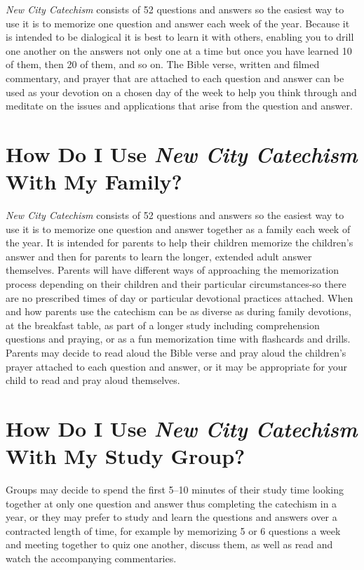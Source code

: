 \documentclass[titlepage]{memoir}
\begin{document}
\emph{New City Catechism}\/ consists of 52 questions and answers so the easiest way to use it is to memorize one question and answer each week of the year. Because it is intended to be dialogical it is best to learn it with others, enabling you to drill one another on the answers not only one at a time but once you have learned 10 of them, then 20 of them, and so on. The Bible verse, written and filmed commentary, and prayer that are attached to each question and answer can be used as your devotion on a chosen day of the week to help you think through and meditate on the issues and applications that arise from the question and answer.

\section[How Do I Use {\em New City Catechism}\/ With My Family?][{\em New City Catechism}\/ With A Family]{How Do I Use {\em New City Catechism}\/ With My Family?}

\emph{New City Catechism}\/ consists of 52 questions and answers so the easiest way to use it is to memorize one question and answer together as a family each week of the year. It is intended for parents to help their children memorize the children's answer and then for parents to learn the longer, extended adult answer themselves. Parents will have different ways of approaching the memorization process depending on their children and their particular circumstances-so there are no prescribed times of day or particular devotional practices attached. When and how parents use the catechism can be as diverse as during family devotions, at the breakfast table, as part of a longer study including comprehension questions and praying, or as a fun memorization time with flashcards and drills. Parents may decide to read aloud the Bible verse and pray aloud the children's prayer attached to each question and answer, or it may be appropriate for your child to read and pray aloud themselves.

\section[How Do I Use {\em New City Catechism}\/ With My Study Group?][{\em New City Catechism}\/ With A Study Group]{How Do I Use {\em New City Catechism}\/ With My Study Group?}

Groups may decide to spend the first 5--10 minutes of their study time looking together at only one question and answer thus completing the catechism in a year, or they may prefer to study and learn the questions and answers over a contracted length of time, for example by memorizing 5 or 6 questions a week and meeting together to quiz one another, discuss them, as well as read and watch the accompanying commentaries.
\end{document}
